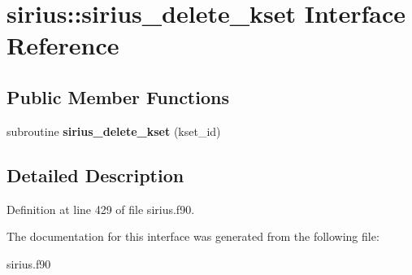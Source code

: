 \hypertarget{interfacesirius_1_1sirius__delete__kset}{}\section{sirius\+:\+:sirius\+\_\+delete\+\_\+kset Interface Reference}
\label{interfacesirius_1_1sirius__delete__kset}
\subsection*{Public Member Functions}
\begin{DoxyCompactItemize}
\item 
\hypertarget{interfacesirius_1_1sirius__delete__kset_aaf6d1b00e8bb39ddeaa2672bcd2025ca}{}subroutine {\bfseries sirius\+\_\+delete\+\_\+kset} (kset\+\_\+id)\label{interfacesirius_1_1sirius__delete__kset_aaf6d1b00e8bb39ddeaa2672bcd2025ca}

\end{DoxyCompactItemize}


\subsection{Detailed Description}


Definition at line 429 of file sirius.\+f90.



The documentation for this interface was generated from the following file\+:\begin{DoxyCompactItemize}
\item 
sirius.\+f90\end{DoxyCompactItemize}
